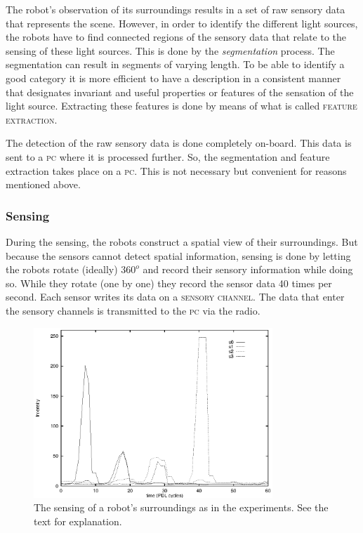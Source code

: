 The robot's observation of its surroundings results in a set of raw sensory data that represents the scene. However, in order to identify the different light sources, the robots have to find connected regions of the sensory data that relate to the sensing of these light sources. This is done by the {\itshape segmentation} process. The segmentation can result in segments of varying length. To be able to identify a good category it is more efficient to have a description in a consistent manner that designates invariant and useful properties or features of the sensation of the light source. Extracting these features is done by means of what is called {\scshape feature extraction}.

The detection of the raw sensory data is done completely on-board. This data is sent to a {\scshape pc} where it is processed further. So, the segmentation and feature extraction takes place on a {\scshape pc}. This is not necessary but convenient for reasons mentioned above.

\subsubsection{Sensing}

During the sensing, the robots construct a spatial view of their surroundings. But because the sensors cannot detect spatial information, sensing is done by letting the robots rotate (ideally) $360^o$ and record their sensory information while doing so. While they rotate (one by one) they record the sensor data 40 times per second. Each sensor writes its data on a {\scshape sensory channel}. The data that enter the sensory channels is transmitted to the {\scshape pc} via the radio.

\begin{figure}
\centerline{\includegraphics[width=9cm]{lang_games/perception1.eps}}
\caption{The sensing of a robot's surroundings as in the experiments. See the text for explanation.}
\label{f:perception1}
\end{figure}

